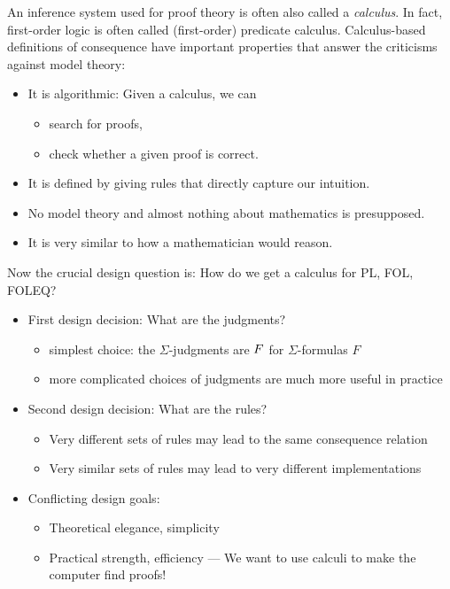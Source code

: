 %

An inference system used for proof theory is often also called a \emph{calculus}. In fact, first-order logic is often called (first-order) predicate calculus.
Calculus-based definitions of consequence have important properties that answer the criticisms against model theory:
\begin{itemize}
 \item It is algorithmic: Given a calculus, we can
   \begin{itemize}
     \item search for proofs,
     \item check whether a given proof is correct.
   \end{itemize}
 \item It is defined by giving rules that directly capture our intuition.
 \item No model theory and almost nothing about mathematics is presupposed.
 \item It is very similar to how a mathematician would reason.
\end{itemize}
\bigskip

Now the crucial design question is: How do we get a calculus for PL, FOL, FOLEQ?
\begin{itemize}
\item First design decision: What are the judgments?
  \begin{itemize}
    \item simplest choice: the $\Sigma$-judgments are $ F$ for $\Sigma$-formulas $F$
    \item more complicated choices of judgments are much more useful in practice
  \end{itemize}
\item Second design decision: What are the rules?
  \begin{itemize}
    \item Very different sets of rules may lead to the same consequence relation
    \item Very similar sets of rules may lead to very different implementations
  \end{itemize}
\item Conflicting design goals:
 \begin{itemize}
   \item Theoretical elegance, simplicity
   \item Practical strength, efficiency  --- We want to use calculi to make the computer find proofs!
 \end{itemize}
\end{itemize}

